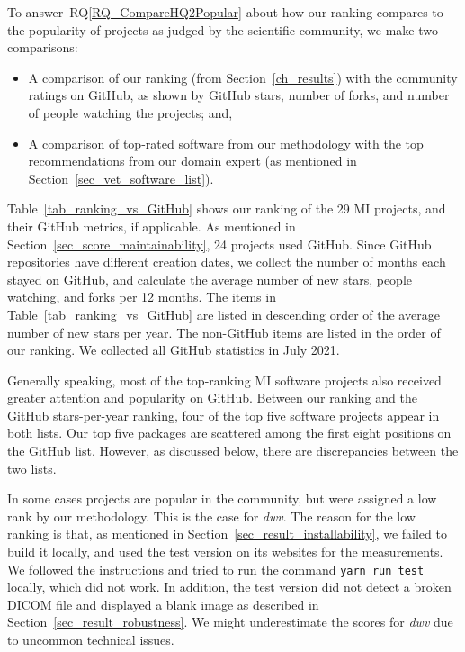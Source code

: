 \documentclass[11pt]{article}
\newcommand{\rqref}[1]{RQ\ref{#1}}
\begin{document}
To answer~\rqref{RQ_CompareHQ2Popular} about how our ranking compares to the
popularity of projects as judged by the scientific community, we make two
comparisons: 

\begin{itemize} 
\item A comparison of our ranking (from Section~\ref{ch_results}) with the
community ratings on GitHub, as shown by GitHub stars, number of forks, and
number of people watching the projects; and,
\item A comparison of top-rated software from our methodology with the top
recommendations from our domain expert (as mentioned in
Section~\ref{sec_vet_software_list}).
\end{itemize}

Table~\ref{tab_ranking_vs_GitHub} shows our ranking of the 29 MI projects, and
their GitHub metrics, if applicable. As mentioned in
Section~\ref{sec_score_maintainability}, 24 projects used GitHub. Since GitHub
repositories have different creation dates, we collect the number of months each
stayed on GitHub, and calculate the average number of new stars, people
watching, and forks per 12 months. The items in
Table~\ref{tab_ranking_vs_GitHub} are listed in descending order of the average
number of new stars per year.  The non-GitHub items are listed in the order of
our ranking.  We collected all GitHub statistics in July 2021.  

Generally speaking, most of the top-ranking MI software projects also received
greater attention and popularity on GitHub. Between our ranking and the GitHub
stars-per-year ranking, four of the top five software projects appear in both
lists. Our top five packages are scattered among the first eight positions on the
GitHub list. However, as discussed below, there are discrepancies between the two
lists.

In some cases projects are popular in the community, but were assigned a low
rank by our methodology.  This is the case for \textit{dwv}. The reason for the
low ranking is that, as mentioned in Section~\ref{sec_result_installability}, we
failed to build it locally, and used the test version on its websites for the
measurements. We followed the instructions and tried to run the command
\texttt{yarn run test} locally, which did not work. In addition, the test
version did not detect a broken DICOM file and displayed a blank image as
described in Section~\ref{sec_result_robustness}. We might underestimate the
scores for \textit{dwv} due to uncommon technical issues. 
\end{document}
